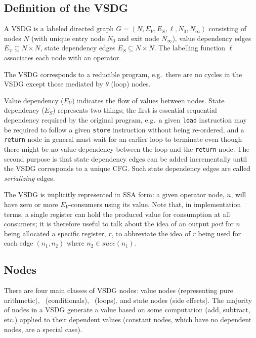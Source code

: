 
\subsection{Definition of the VSDG}

A VSDG is a labeled directed graph $G=(N,E_V,E_S,\ell,N_0,N_\infty)$ consisting of nodes $N$ (with unique entry node $N_0$ and exit node $N_\infty$), value dependency edges $E_V \subseteq N \times N$, state dependency edges $E_S \subseteq N \times N$. 
The labelling function $\ell$ associates each node with an operator.

The VSDG corresponds to a reducible program, e.g.~there are no cycles in the VSDG except those mediated by $\theta$ (loop) nodes.

Value dependency ($E_V$) indicates the flow of values between nodes. 
State dependency ($E_S$) represents two things; 
the first is essential sequential dependency required by the original program, e.g.~a given \texttt{load} instruction may be required to follow a given \texttt{store} instruction without being re-ordered, and a \texttt{return} node in general must wait for an earlier loop to terminate even though there might be no value-dependency between the loop and the \texttt{return} node. 
The second purpose is that state dependency edges can be added incrementally until the VSDG corresponds to a unique CFG. 
Such state dependency edges are called {\em serializing} edges.

The VSDG is implicitly represented in SSA form: 
a given operator node, $n$, will have zero or more $E_V$-consumers using its value. 
Note that, in implementation terms, a single register can hold the produced value for consumption at all consumers; 
it is therefore useful to talk about the idea of an output {\em port} for $n$ being allocated a specific register, $r$, to abbreviate the idea of $r$ being used for each edge $(n_1,n_2)$ where $n_2 \in \textit{succ}(n_1)$.


\subsection{Nodes}
There are four main classes of VSDG nodes: 
value nodes (representing pure arithmetic), \Gns\ (conditionals), \Tns\ (loops), and state nodes (side effects). 
The majority of nodes in a VSDG generate a value based on some computation (add, subtract, etc.) applied to their dependent values (constant nodes, which have no dependent nodes, are a special case).


